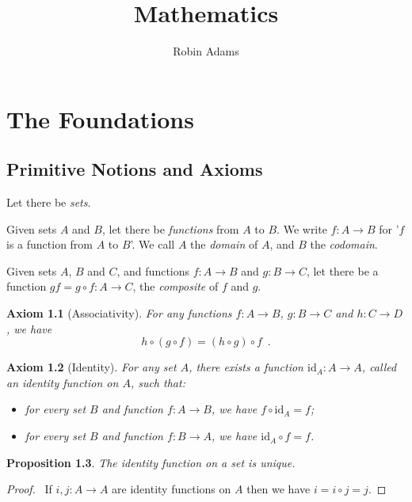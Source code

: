 \documentclass{book}
\title{Mathematics}
\author{Robin Adams}
\let\qed\relax
\newtheorem{ax}{Axiom}[chapter]
\newtheorem{prop}[ax]{Proposition}
\theoremstyle{definition}
\newcommand{\id}[1]{\ensuremath{\mathrm{id}_{#1}}}
\begin{document}
\maketitle
\tableofcontents

\chapter{The Foundations}

\section{Primitive Notions and Axioms}

Let there be \emph{sets}.

Given sets $A$ and $B$, let there be \emph{functions} from $A$ to $B$. We write $f : A \rightarrow B$ for '$f$ is a function from $A$ to $B$'. We call $A$ the \emph{domain} of $A$, and $B$ the \emph{codomain}.

Given sets $A$, $B$ and $C$, and functions $f : A \rightarrow B$ and $g : B \rightarrow C$, let there be a function $gf = g \circ f : A \rightarrow C$, the \emph{composite} of $f$ and $g$.

\begin{ax}[Associativity]
For any functions $f : A \rightarrow B$, $g : B \rightarrow C$ and $h : C \rightarrow D$, we have
\[ h \circ (g \circ f) = (h \circ g) \circ f \enspace . \]
\end{ax}

\begin{ax}[Identity]
For any set $A$, there exists a function $\id{A} : A \rightarrow A$, called an \emph{identity} function on $A$, such that:
\begin{itemize}
\item for every set $B$ and function $f : A \rightarrow B$, we have $f \circ \id{A} = f$;
\item for every set $B$ and function $f : B \rightarrow A$, we have $\id{A} \circ f = f$.
\end{itemize}
\end{ax}

\begin{prop}
The identity function on a set is unique.
\end{prop}

\begin{proof}
\pf\ If $i, j : A \rightarrow A$ are identity functions on $A$ then we have $i = i \circ j = j$. \qed
\end{proof}
\end{document}
